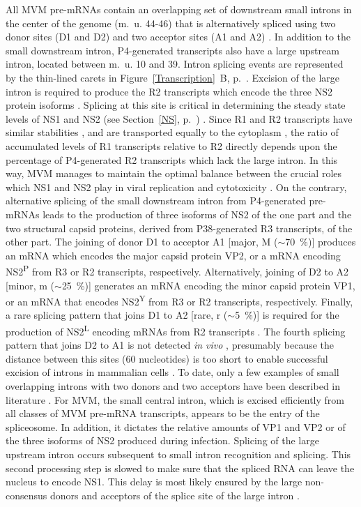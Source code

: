 All MVM pre-mRNAs contain an overlapping set of downstream small introns in the center of the genome (m.~u. 44-46) that is alternatively spliced using two donor sites (D1 and D2) and two acceptor sites (A1 and A2) \cite{pmid2942705, pmid3783817, pmid2164605, pmid2142555}. In addition to the small downstream intron, P4-generated transcripts also have a large upstream intron, located between m.~u. 10 and 39. Intron splicing events are represented by the thin-lined carets in Figure~\ref{Transcription}~B, p.~\pageref{Transcription}. Excision of the large intron is required to produce the R2 transcripts which encode the three NS2 protein isoforms \cite{pmid6623929, pmid6828378, pmid2942705}. Splicing at this site is critical in determining the steady state levels of NS1 and NS2 (see Section~\ref{NS}, p.~\pageref{NS}) \cite{pmid1825251, pmid2142555}. Since R1 and R2 transcripts have similar stabilities \cite{pmid1825251}, and are transported equally to the cytoplasm \cite{pmid1592259}, the ratio of accumulated levels of R1 transcripts relative to R2 directly depends upon the percentage of P4-generated R2 transcripts which lack the large intron. In this way, MVM manages to maintain the optimal balance between the crucial roles which NS1 and NS2 play in viral replication and cytotoxicity \cite{pmid3296697}. On the contrary, alternative splicing of the small downstream intron from P4-generated pre-mRNAs leads to the production of three isoforms of NS2 \cite{pmid3783817, pmid2142555, pmid2164605} of the one part and the two structural capsid proteins, derived from P38-generated R3 transcripts, of the other part. The joining of donor D1 to acceptor A1 [major, M ($\sim$70~\%)] produces an mRNA which encodes the major capsid protein VP2, or a mRNA encoding NS2\textsuperscript{P} from R3 or R2 transcripts, respectively. Alternatively, joining of D2 to A2 [minor, m ($\sim$25~\%)] generates an mRNA encoding the minor capsid protein VP1, or an mRNA that encodes NS2\textsuperscript{Y} from R3 or R2 transcripts, respectively. Finally, a rare splicing pattern that joins D1 to A2 [rare, r ($\sim$5~\%)] is required for the production of NS2\textsuperscript{L} encoding mRNAs from R2 transcripts \cite{pmid3502703, pmid2942705, pmid3783817, pmid3951017}. The fourth splicing pattern that joins D2 to A1 is not detected \textit{in vivo} \cite{pmid3783817}, presumably because the distance between this sites (60 nucleotides) is too short to enable successful excision of introns in mammalian cells \cite{pmid2943217}. To date, only a few examples of small overlapping introns with two donors and two acceptors have been described in literature \cite{pmid1335742, pmid1824726, pmid1839712}. For MVM, the small central intron, which is excised efficiently from all classes of MVM pre-mRNA transcripts, appears to be the entry of the spliceosome. In addition, it dictates the relative amounts of VP1 and VP2 or of the three isoforms of NS2 produced during infection. Splicing of the large upstream intron occurs subsequent to small intron recognition and splicing. This second processing step is slowed to make sure that the spliced RNA can leave the nucleus to encode NS1. This delay is most likely ensured by the large non-consensus donors and acceptors of the splice site of the large intron \cite{Transcription}. 
